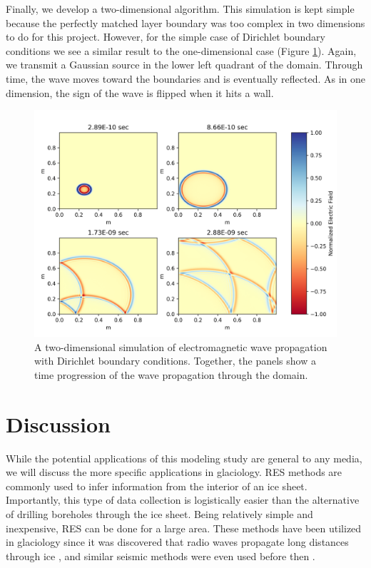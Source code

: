 \documentclass[a4paper]{article}
\begin{document}
Finally, we develop a two-dimensional algorithm. This simulation is kept simple because the perfectly matched layer boundary was too complex in two dimensions to do for this project. However, for the simple case of Dirichlet boundary conditions we see a similar result to the one-dimensional case (Figure \ref{fig:2D}). Again, we transmit a Gaussian source in the lower left quadrant of the domain. Through time, the wave moves toward the boundaries and is eventually reflected. As in one
dimension, the sign of the wave is flipped when it hits a wall. 

\begin{figure}
    \centering
    \includegraphics[width=\textwidth]{./Figures/2D_figure.png}
    \caption{A two-dimensional simulation of electromagnetic wave propagation with Dirichlet boundary conditions. Together, the panels show a time progression of the wave propagation through the domain.}
    \label{fig:2D}
\end{figure}

\section{Discussion}

While the potential applications of this modeling study are general to any media, we will discuss the more specific applications in glaciology. RES methods are commonly used to infer information from the interior of an ice sheet. Importantly, this type of data collection is logistically easier than the alternative of drilling boreholes through the ice sheet. Being relatively simple and inexpensive, RES can be done for a large area. These methods have been utilized in glaciology since it was discovered that radio waves propagate long distances through ice \cite{Evans1961}, and similar seismic methods were even used before then \cite{Robin1958}. 
\end{document}
